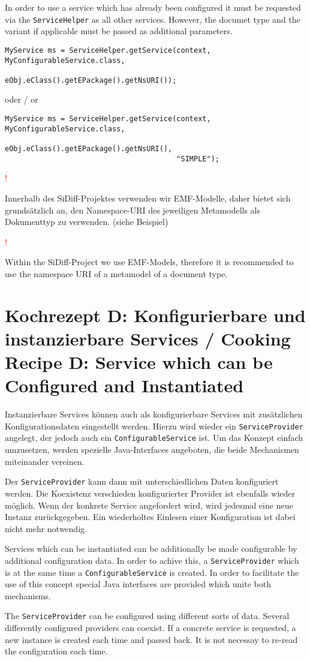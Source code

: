\documentclass[10pt,a4paper]{scrartcl}
\newcommand{\hinweis}[1]{
\begin{framed}
\begin{minipage}[t]{0.02\textwidth}
\textcolor{red}{\Huge{\sffamily !}}
\end{minipage}
\begin{minipage}[t]{0.94\textwidth}
#1
\end{minipage}
\end{framed}
}
\providecommand{\deng}[2]{#1 / {\sffamily #2}}
\providecommand{\deutsch}[1]{#1}
\providecommand{\englisch}[1]{{\sffamily #1}}
\begin{document}
\englisch{In order to use a service which has already been configured it must be requested via the \texttt{ServiceHelper} as all other services. However, the documet type and the variant if applicable must be passed as additional parameters.}

\begin{lstlisting}
MyService ms = ServiceHelper.getService(context, MyConfigurableService.class, 
                                        eObj.eClass().getEPackage().getNsURI());
\end{lstlisting}
\deng{oder}{or}
\begin{lstlisting}
MyService ms = ServiceHelper.getService(context, MyConfigurableService.class, 
                                        eObj.eClass().getEPackage().getNsURI(),
                                        "SIMPLE");
\end{lstlisting}

\deutsch{\hinweis{Innerhalb des SiDiff-Projektes verwenden wir EMF-Modelle, daher bietet
sich grundsätzlich an, den Namespace-URI des jeweiligen Metamodells als
Dokumenttyp zu verwenden. (siehe Beispiel)}}

\englisch{\hinweis{Within the SiDiff-Project we use EMF-Models, therefore it is recommended to use the namespace URI of a metamodel of a document type.}}



\clearpage
\section{\deng{Kochrezept D: Konfigurierbare und instanzierbare Services}{Cooking Recipe D: Service which can be Configured and Instantiated}}
\deutsch{Instanzierbare Services können auch als konfigurierbare Services mit
zusätzlichen Konfigurationsdaten eingestellt werden. Hierzu wird wieder ein
\texttt{ServiceProvider} angelegt, der jedoch auch ein
\texttt{ConfigurableService} ist. Um das Konzept einfach umzusetzen, werden
spezielle Java-Interfaces angeboten, die beide Mechanismen miteinander vereinen.

Der \texttt{ServiceProvider} kann dann mit unterschiedlichen Daten konfiguriert
werden. Die Koexistenz verschieden konfigurierter Provider ist ebenfalls wieder
möglich. Wenn der konkrete Service angefordert wird, wird jedesmal eine neue
Instanz zurückgegeben. Ein wiederholtes Einlesen einer Konfiguration ist dabei
nicht mehr notwendig.}

\englisch{Services which can be instantiated can be additionally be made
configurable by additional configuration data. In order to achive this, a
\texttt{ServiceProvider} which is at the same time a
\texttt{ConfigurableService} is created. In order to facilitate the use of this
concept special Java interfaces are provided which unite both mechanisms.

The \texttt{ServiceProvider} can be configured using different sorts of data.
Several differently configured providers can coexist. If a concrete service is
requested, a new instance is created each time and passed back. It is not
necessay to re-read the configuration each time.}
\end{document}
